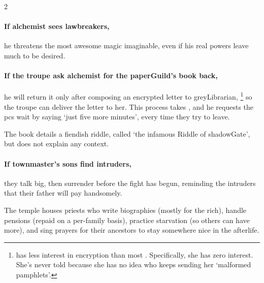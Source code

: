 \begin{multicols}{2}
\citadelAlchemist
\label{citadel_alchemist}

\showStdSpells

\paragraph{If \gls{alchemist} sees lawbreakers,}
he threatens the most awesome magic imaginable, even if his real powers leave much to be desired.

\paragraph{If the troupe ask \gls{alchemist} for the \gls{paperGuild}'s book back,}
he will return it only after composing an encrypted letter to \gls{greyLibrarian},%
\footnote{ has less interest in encryption than most .
Specifically, she has zero interest.
She's never told  because she has no idea who keeps sending her `malformed pamphlets'.}
so the troupe can deliver the letter to her.
This process takes , and he requests the \glspl{pc} wait by saying `just five more minutes', every time they try to leave.

The book details a fiendish riddle, called `the infamous Riddle of \gls{shadowGate}', but does not explain any context.


\label{hardestRiddle}
\hardestRiddleEver



\paragraph{If \gls{townmaster}'s sons find intruders,}
they talk big, then surrender before the fight has begun, reminding the intruders that their father will pay handsomely.


The temple houses priests who write biographies (mostly for the rich), handle pensions (repaid on a per-family basis), practice starvation (so others can have more), and sing prayers for their ancestors to stay somewhere nice in the afterlife.


\end{multicols}
